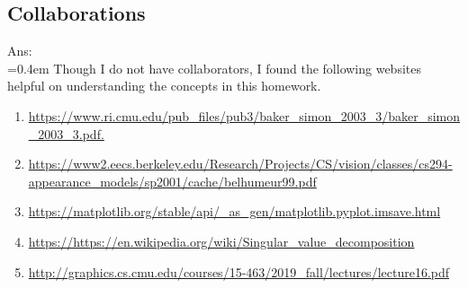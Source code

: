 \documentclass{article}
\begin{document}
	\subsection*{Collaborations}
	Ans:\\
	\hangindent=0.4em \hspace{0.3em} Though I do not have collaborators, I found the following websites helpful on understanding the concepts in this homework.
	\begin{enumerate}
		\item \url{https://www.ri.cmu.edu/pub_files/pub3/baker_simon_2003_3/baker_simon_2003_3.pdf.}
		\item \url{https://www2.eecs.berkeley.edu/Research/Projects/CS/vision/classes/cs294-appearance_models/sp2001/cache/belhumeur99.pdf}
		\item \url{https://matplotlib.org/stable/api/_as_gen/matplotlib.pyplot.imsave.html}	
		\item \url{https://https://en.wikipedia.org/wiki/Singular_value_decomposition}	
		\item \url{http://graphics.cs.cmu.edu/courses/15-463/2019_fall/lectures/lecture16.pdf}
	\end{enumerate}
\end{document}

